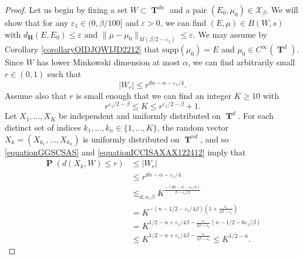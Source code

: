 \documentclass[12pt,reqno]{article}
\numberwithin{equation}{section}
\DeclareMathOperator{\TT}{\mathbf{T}}
\numberwithin{theorem}{section}
\DeclareMathOperator{\PP}{\mathbf{P}}
\begin{document}
\begin{proof}
    Let us begin by fixing a set $W \subset \TT^{dn}$ and a pair $(E_0,\mu_0) \in \mathcal{X}_\beta$. We will show that for any $\varepsilon_1 \in (0,\beta/100]$ and $\varepsilon > 0$, we can find $(E,\mu) \in B(W,s)$ with $d_\mathbf{H}(E,E_0) \leq \varepsilon$ and $\| \mu - \mu_0 \|_{M(\beta/2 - \varepsilon_1)} \leq \varepsilon$. We may assume by Corollary \ref{corollaryOIDJOWIJD2212} that $\text{supp}(\mu_0) = E$ and $\mu_0 \in C^\infty(\TT^d)$. Since $W$ has lower Minkowski dimension at most $\alpha$, we can find arbitrarily small $r \in (0,1)$ such that
    \begin{equation} \label{equationGGSCSAS}
        |W_r| \leq r^{dn - \alpha - \varepsilon_1/4}.
    \end{equation}
    Assume also that $r$ is small enough that we can find an integer $K \geq 10$ with
    \begin{equation} \label{equationICCISAXAX122412}
        r^{\varepsilon_1/2 - \beta} \leq K \leq r^{\varepsilon_1/2 - \beta} + 1.
    \end{equation}
    Let $X_1, \dots, X_K$ be independent and uniformly distributed on $\TT^d$. For each distinct set of indices $k_1, \dots, k_n \in \{ 1, \dots, K \}$, the random vector $X_k = (X_{k_1}, \dots, X_{k_n})$ is uniformly distributed on $\TT^{nd}$, and so \eqref{equationGGSCSAS} and \eqref{equationICCISAXAX122412} imply that
    \begin{equation} \label{equationGGASDCJWIJSFGGGG}
    \begin{split}
        \PP(d(X_k,W) \leq r) &\leq |W_{r}|\\
        &\leq r^{dn - \alpha - \varepsilon_1/4}\\
        &\lesssim_{d,n,\beta} K^{\frac{-(dn - \alpha - \varepsilon_1/4)}{\beta - \varepsilon_1/2}}\\
        &= K^{- \left( n - 1/2 - \varepsilon_1 / 4 \beta \right) \left( 1 + \frac{\varepsilon_1}{2\beta - \varepsilon_1} \right)}\\
        &= K^{1/2 - n + \varepsilon_1 / 4\beta - \frac{\varepsilon_1}{2\beta - \varepsilon_1}\left( n - 1/2 - 6\varepsilon_1/\beta \right)}\\
        &\leq K^{1/2 - n + \varepsilon_1/4\beta - \frac{\varepsilon_1}{2\beta - \varepsilon_1}} \leq K^{1/2 - n}.
    \end{split}
    \end{equation}

\end{proof}
\end{document}
